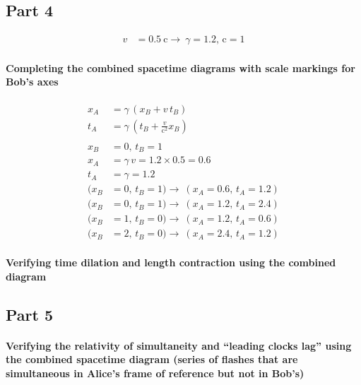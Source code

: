 \documentclass[pagesize,headsepline,10pt,parskip=half]{scrreprt}
\newcommand{\const}[1]{\ensuremath{\mathrm{#1}}}
\renewcommand{\c}{\const{c}}
\begin{document}
      \subsection{Part 4}
        \begin{samepage}
          \begin{align*}
           v &= \SI{0.5}{\c} \rightarrow~\gamma = 1.2, \, \c = 1
          \end{align*}

          \paragraph{Completing the combined spacetime diagrams with scale markings for Bob’s axes}
            \begin{align*}
              x_A &= \gamma \, \left(x_B + v \, t_B\right)\\
              t_A &= \gamma \, \left(t_B + \frac{v}{\c^2} x_B\right)\\
              \\
              x_B &= 0, \, t_B = 1\\
              x_A &= \gamma \, v = 1.2 \times 0.5 = 0.6\\
              t_A &= \gamma = 1.2\\
              (x_B &= 0, \, t_B = 1) \rightarrow~(x_A = 0.6, \, t_A = 1.2)\\
              (x_B &= 0, \, t_B = 1) \rightarrow~(x_A = 1.2, \, t_A = 2.4)\\
              (x_B &= 1, \, t_B = 0) \rightarrow~(x_A = 1.2, \, t_A = 0.6)\\
              (x_B &= 2, \, t_B = 0) \rightarrow~(x_A = 2.4, \, t_A = 1.2)
            \end{align*}

          \paragraph{Verifying time dilation and length contraction using the combined diagram}
        \end{samepage}

      \subsection{Part 5}
        \paragraph{Verifying the relativity of simultaneity and
          “leading clocks lag” using the combined spacetime diagram
          (series of flashes that are simultaneous in Alice’s frame of reference
          but not in Bob’s)}
\end{document}
